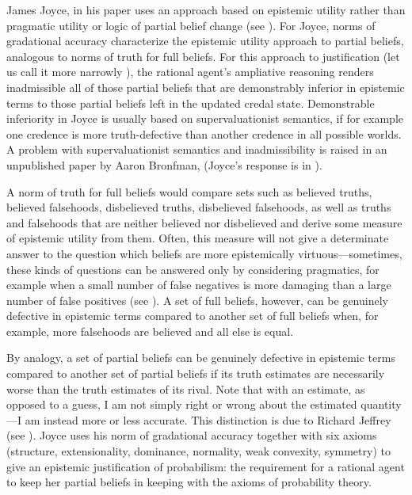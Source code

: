 \documentclass[smallextended]{svjour3}       %
\begin{document}
James Joyce, in his paper  uses an approach based on epistemic utility rather
than pragmatic utility or logic of partial belief change (see
). For Joyce, norms of gradational accuracy
characterize the epistemic utility approach to partial beliefs,
analogous to norms of truth for full beliefs. For this approach to
justification (let us call it more narrowly ), the rational agent's ampliative reasoning renders
inadmissible all of those partial beliefs that are demonstrably
inferior in epistemic terms to those partial beliefs left in the
updated credal state. Demonstrable inferiority in Joyce is usually
based on supervaluationist semantics, if for example one credence is
more truth-defective than another credence in all possible worlds. A
problem with supervaluationist semantics and inadmissibility is raised
in an unpublished paper by Aaron Bronfman,  (Joyce's response is in
). 

A norm of truth for full beliefs would compare sets such as believed
truths, believed falsehoods, disbelieved truths, disbelieved
falsehoods, as well as truths and falsehoods that are neither believed
nor disbelieved and derive some measure of epistemic utility from
them. Often, this measure will not give a determinate answer to the
question which beliefs are more epistemically virtuous---sometimes,
these kinds of questions can be answered only by considering
pragmatics, for example when a small number of false negatives is more
damaging than a large number of false positives (see
). A set of full beliefs, however, can be
genuinely defective in epistemic terms compared to another set of full
beliefs when, for example, more falsehoods are believed and all else
is equal.

By analogy, a set of partial beliefs can be genuinely defective in
epistemic terms compared to another set of partial beliefs if its
truth estimates are necessarily worse than the truth estimates of its
rival. Note that with an estimate, as opposed to a guess, I am not
simply right or wrong about the estimated quantity---I am instead more
or less accurate. This distinction is due to Richard Jeffrey (see
). Joyce uses his norm of gradational accuracy
together with six axioms (structure, extensionality, dominance,
normality, weak convexity, symmetry) to give an epistemic
justification of probabilism: the requirement for a rational agent to
keep her partial beliefs in keeping with the axioms of probability
theory.
\end{document}
